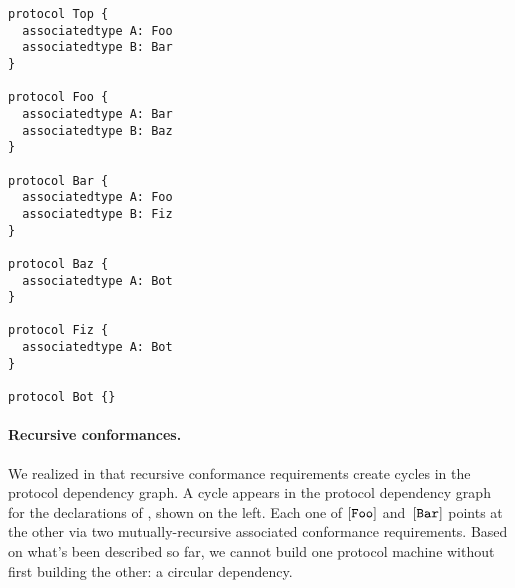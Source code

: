 \documentclass[../generics]{subfiles}
\begin{document}
\begin{listing}\label{protocol component listing}
\begin{Verbatim}
protocol Top {
  associatedtype A: Foo
  associatedtype B: Bar
}

protocol Foo {
  associatedtype A: Bar
  associatedtype B: Baz
}

protocol Bar {
  associatedtype A: Foo
  associatedtype B: Fiz
}

protocol Baz {
  associatedtype A: Bot
}

protocol Fiz {
  associatedtype A: Bot
}

protocol Bot {}
\end{Verbatim}
\end{listing}

\begin{wrapfigure}[12]{r}{3.6cm}
\end{wrapfigure}

\paragraph{Recursive conformances.}
We realized in  that recursive conformance requirements create cycles in the protocol dependency graph. A cycle appears in the protocol dependency graph for the declarations of , shown on the left. Each one of $[\texttt{Foo}]$ and~$[\texttt{Bar}]$ points at the other via two mutually-recursive associated conformance requirements. Based on what's been described so far, we cannot build one protocol machine without first building the other: a circular dependency.
\end{document}
